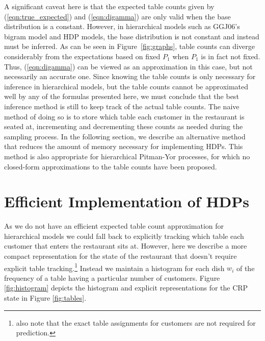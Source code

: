 \documentclass[11pt]{article}
\begin{document}

A significant caveat here is that the expected table counts given by (\ref{eqn:true_expected}) and (\ref{eqn:digamma}) are only valid when the base distribution is a constant.  However, in hierarchical models such as GGJ06's bigram model and HDP models, the base distribution is not constant and instead must be inferred.  As can be seen in Figure~\ref{fig:graphs}, table counts can diverge considerably from the expectations based on fixed $P_1$ when $P_1$ is in fact not fixed.  Thus,  (\ref{eqn:digamma}) can be viewed as an approximation in this case, but not necessarily an accurate one.  Since knowing the table counts is only necessary for inference in hierarchical models, but the table counts cannot be approximated well by any of the formulas presented here, we must conclude that the best inference method is still to keep track of the actual table counts.  The naive method of doing so is to store which table each customer in the restaurant is seated at, incrementing and decrementing these counts as needed during the sampling process.  In the following section, we describe an alternative method that reduces the amount of memory necessary for implementing HDPs.  This method is also appropriate for hierarchical Pitman-Yor processes, for which no closed-form approximations to the table counts have been proposed.


\section{Efficient Implementation of HDPs}

As we do not have an efficient expected table count approximation for hierarchical models we could fall back to explicitly tracking which table each customer that enters the restaurant sits at.
However, here we describe a more compact representation for the state of the restaurant that doesn't require explicit table tracking.\footnote{ also note that the exact table assignments for customers are not required for prediction.}
Instead we maintain a histogram for each dish $w_i$ of the frequency of a table having a particular number of customers.
Figure \ref{fig:histogram} depicts the histogram and explicit representations for the CRP state in Figure \ref{fig:tables}.
\end{document}
